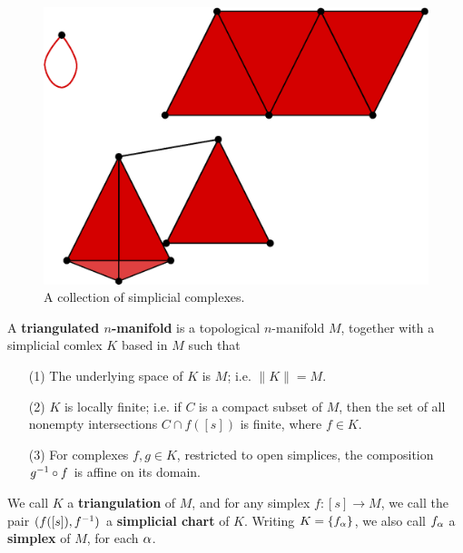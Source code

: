 \begin{figure}[h]
    \centering
    \includegraphics[scale=0.5]{Figures/Chapter1/simplicial_complexes.eps}
    \caption{A collection of simplicial complexes.}
    \label{figure_1.9}
\end{figure}

\begin{definition}
    A \textbf{triangulated $n$-manifold} is a topological $n$-manifold $M$,
    together with a simplicial comlex  $K$ based in  $M$ such that
    \begin{enumerate}
        \item[(1)] The underlying space of $K$ is  $M$; i.e.  $\|K\|=M$.

        \item[(2)] $K$ is locally finite; i.e. if  $C$ is a compact subset of
            $M$, then the set of all nonempty intersections  $C \cap f([s])$ is
            finite, where $f \in K$.

        \item[(3)] For complexes $f,g \in K$, restricted to open simplices, the
            composition  $g^{-1} \circ f$ is affine on its domain.
    \end{enumerate}
    We call $K$ a  \textbf{triangulation} of $M$, and for any simplex $f:[s]
    \xrightarrow{} M$, we call the pair $(f([s]),f^{-1})$ a \textbf{simplicial
    chart} of $K$. Writing $K=\{f_\alpha\}$, we also call  $f_\alpha$ a
    \textbf{simplex} of $M$, for each  $\alpha$.
\end{definition}

